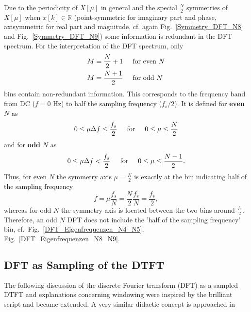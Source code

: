 \documentclass[11pt,a4paper,DIV=12]{scrartcl}
\begin{document}
%
Due to the periodicity of $X[\mu]$ in general and the special $\frac{N}{2}$
symmetries of $X[\mu]$ when $x[k]\in\mathbb{R}$
(point-symmetric for imaginary part and phase, axisymmetric for real part and
magnitude, cf. again Fig.~\ref{Symmetry_DFT_N8} and Fig.~\ref{Symmetry_DFT_N9})
some information is redundant in the DFT spectrum.
%
For the interpretation of the DFT spectrum, only
\begin{align}
M&=\frac{N}{2}+1 \hspace{5mm}\text{for even }N\nonumber\\
M&=\frac{N+1}{2} \hspace{5mm}\text{for odd }N
\end{align}
bins contain non-redundant information.
%
This corresponds to the frequency band from DC ($f=0$ Hz) to half the sampling
frequency ($f_s/2$).
%
It is defined for \textbf{even} $N$ as
\begin{equation}
0\leq\mu\Delta f\leq\frac{f_s}{2} \hspace{5mm}\text{for}\hspace{5mm} 0\leq\mu\leq\frac{N}{2}
\end{equation}
and for \textbf{odd} $N$ as
\begin{equation}
0\leq\mu\Delta f<\frac{f_s}{2} \hspace{5mm}\text{for}\hspace{5mm} 0\leq\mu\leq\frac{N-1}{2}.
\end{equation}
%
Thus, for even $N$ the symmetry axis $\mu=\frac{N}{2}$ is exactly at the bin
indicating half of the sampling frequency
%
\begin{equation}
f=\mu\frac{f_s}{N}=\frac{N}{2}\frac{f_s}{N}=\frac{f_s}{2},
\end{equation}
%
whereas for odd $N$ the symmetry axis is located between the two bins around
$\frac{f_s}{2}$.
%
Therefore, an odd $N$ DFT does not include the 'half of the sampling frequency'
bin, cf.~Fig.~\ref{DFT_Eigenfrequenzen_N4_N5}, Fig.~\ref{DFT_Eigenfrequenzen_N8_N9}.

\subsection{DFT as Sampling of the DTFT}
The following discussion of the discrete Fourier transform (DFT) as a sampled
DTFT and explanations concerning windowing were inspired by the brilliant
script \cite{Moeser2011} and became extended. A very similar didactic concept
is approached in \cite[Ch.~7.3,~7.4]{Kammeyer2002}
\end{document}
